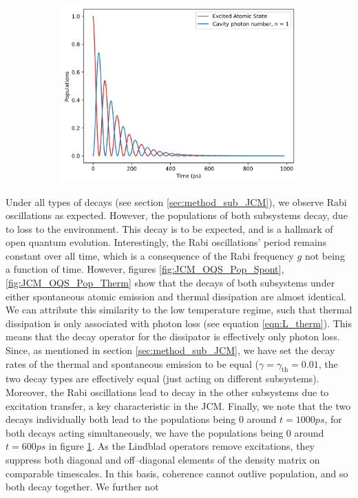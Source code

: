 \documentclass[11pt]{article}
\begin{document}
\begin{figure}[H]
    \vspace{0.5cm}
    
    \begin{subfigure}{0.45\textwidth} 
        \centering
        \includegraphics[width=\linewidth]{Research Project/Code/results/JCM/OQS_Pop_Both.png}
        \caption{}
         \label{fig:JCM_OQS_Pop_Both}
    \end{subfigure}
    \hfill
    \caption{}
    \label{fig:JCM_OQS_Pop}
\end{figure}

Under all types of decays (see section \ref{sec:method_sub_JCM}), we observe Rabi oscillations as expected. However, the populations of both subsystems decay, due to loss to the environment. This decay is to be expected, and is a hallmark of open quantum evolution. Interestingly, the Rabi oscillations' period remains constant over all time, which is a consequence of the Rabi frequency $g$ not being a function of time. However, figures \ref{fig:JCM_OQS_Pop_Spont}, \ref{fig:JCM_OQS_Pop_Therm} show that the decays of both subsystems under either spontaneous atomic emission and thermal dissipation are almost identical. We can attribute this similarity to the low temperature regime, such that thermal dissipation is only associated with photon loss (see equation \eqref{eqn:L_therm}). This means that the decay operator for the dissipator is effectively only photon loss. Since, as mentioned in section \ref{sec:method_sub_JCM}, we have set the decay rates of the thermal and spontaneous emission to be equal ($\gamma = \gamma_{\scriptscriptstyle \text{th}} =0.01$, the two decay types are effectively equal (just acting on different subsystems). Moreover, the Rabi oscillations lead to decay in the other subsystems due to excitation transfer, a key characteristic in the JCM. Finally, we note that the two decays individually both lead to the populations being 0 around $t = 1000 ps$, for both decays acting simultaneously, we have the populations being 0 around $t = 600 ps$ in figure \ref{fig:JCM_OQS_Pop_Both}. As the Lindblad operators remove excitations, they suppress both diagonal and off--diagonal elements of the density matrix on comparable timescales. In this basis, coherence cannot outlive population, and so both decay together. We further not
\end{document}
